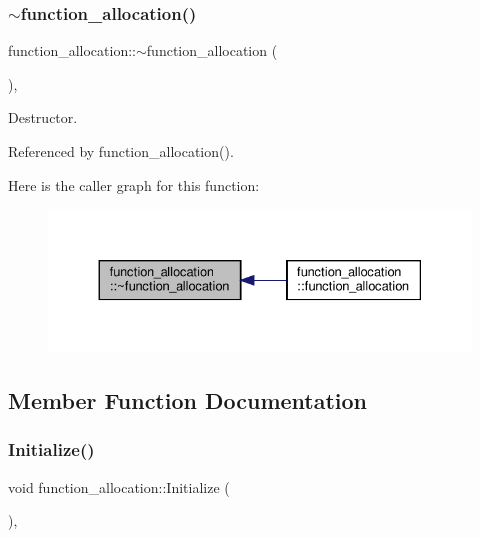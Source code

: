 \subsubsection{\texorpdfstring{$\sim$function\+\_\+allocation()}{~function\_allocation()}}
{\footnotesize\ttfamily function\+\_\+allocation\+::$\sim$function\+\_\+allocation (\begin{DoxyParamCaption}{ }\end{DoxyParamCaption})\hspace{0.3cm}{\ttfamily [override]}, {\ttfamily [default]}}



Destructor. 



Referenced by function\+\_\+allocation().

Here is the caller graph for this function\+:
\nopagebreak
\begin{figure}[H]
\begin{center}
\leavevmode
\includegraphics[width=330pt]{de/d0f/classfunction__allocation_a2d9c00c0efcdf85095888b683d6a5054_icgraph}
\end{center}
\end{figure}


\subsection{Member Function Documentation}
\mbox{\label{classfunction__allocation_a48d784232dd4383a11ff009a3cd78b30}} 
\subsubsection{\texorpdfstring{Initialize()}{Initialize()}}
{\footnotesize\ttfamily void function\+\_\+allocation\+::\+Initialize (\begin{DoxyParamCaption}{ }\end{DoxyParamCaption})\hspace{0.3cm}{\ttfamily [override]}, {\ttfamily [virtual]}}



